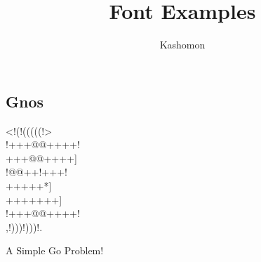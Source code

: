 \documentclass{article}
\begin{document}
\title{Font Examples}
\author{Kashomon}
\maketitle

\begin{center}
\section*{Gnos}
{\gnos%
<!(!(((((!>\\
!+++@@++++!\\
+++@@++++]\\
!@@++!+++!\\
+++++*]\\
+++++++]\\
!+++@@++++!\\
,!)))!)))!.\\
}

A Simple Go Problem!
\end{center}
\end{document}
